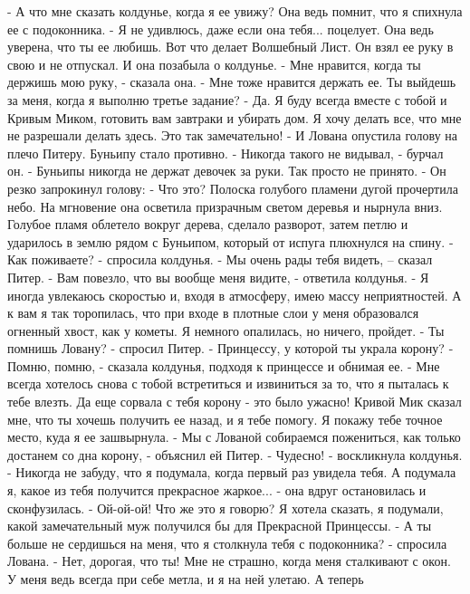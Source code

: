     - А что мне сказать колдунье, когда я ее увижу? Она ведь помнит, 
что я спихнула ее с подоконника.
    - Я не удивлюсь, даже если она тебя... поцелует. Она ведь уверена, 
что ты ее любишь. Вот что делает Волшебный Лист.
    Он взял ее руку в свою и не отпускал. И она позабыла о колдунье.
    - Мне нравится, когда ты держишь мою руку, - сказала она.
    - Мне тоже нравится держать ее. Ты выйдешь за меня, когда я 
выполню третье задание?
    - Да. Я буду всегда вместе с тобой и Кривым Миком, готовить вам 
завтраки и убирать дом. Я хочу делать все, что мне не разрешали делать 
здесь. Это так замечательно! - И Лована опустила голову на плечо 
Питеру.
    Буньипу стало противно.
    - Никогда такого не видывал, - бурчал он. - Буньипы никогда не 
держат девочек за руки. Так просто не принято. - Он резко запрокинул 
голову: - Что это?
    Полоска голубого пламени дугой прочертила небо. На мгновение она 
осветила призрачным светом деревья и нырнула вниз. Голубое пламя 
облетело вокруг дерева, сделало разворот, затем петлю и ударилось в 
землю рядом с Буньипом, который от испуга плюхнулся на спину.
    - Как поживаете? - спросила колдунья.
    - Мы очень рады тебя видеть, -- сказал Питер.
    - Вам повезло, что вы вообще меня видите, - ответила колдунья. - Я 
иногда увлекаюсь скоростью и, входя в атмосферу, имею массу 
неприятностей. А к вам я так торопилась, что при входе в плотные слои 
у меня образовался огненный хвост, как у кометы. Я немного опалилась, 
но ничего, пройдет.
    - Ты помнишь Ловану? - спросил Питер. - Принцессу, у которой ты 
украла корону?
    - Помню, помню, - сказала колдунья, подходя к принцессе и обнимая 
ее. - Мне всегда хотелось снова с тобой встретиться и извиниться за 
то, что я пыталась к тебе влезть. Да еще сорвала с тебя корону - это 
было ужасно! Кривой Мик сказал мне, что ты хочешь получить ее назад, и 
я тебе помогу. Я покажу тебе точное место, куда я ее зашвырнула.
    - Мы с Лованой собираемся пожениться, как только достанем со дна 
корону, - объяснил ей Питер.
    - Чудесно! - воскликнула колдунья. - Никогда не забуду, что я 
подумала, когда первый раз увидела тебя. А подумала я, какое из тебя 
получится прекрасное жаркое... - она вдруг остановилась и 
сконфузилась. - Ой-ой-ой! Что же это я говорю? Я хотела сказать, я 
подумали, какой замечательный муж получился бы для Прекрасной 
Принцессы.
    - А ты больше не сердишься на меня, что я столкнула тебя с 
подоконника? - спросила Лована.
    - Нет, дорогая, что ты! Мне не страшно, когда меня сталкивают с 
окон. У меня ведь всегда при себе метла, и я на ней улетаю. А теперь 
